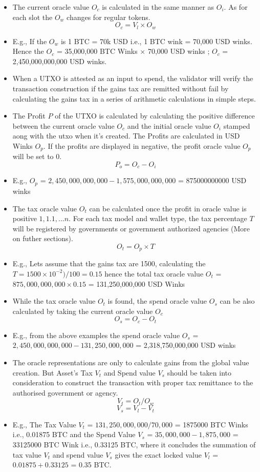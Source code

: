 \documentclass[letterpaper,11pt]{article}
\begin{document}
\begin{itemize}[wide, labelwidth=!, labelindent=0pt]
\item The current oracle value $O_c$ is calculated in the same manner as $O_i$. As for each slot the $O_w$ changes for regular tokens.
\[O_c = V_l \times O_w\]
\item E.g., If the $O_w$ is 1 BTC = 70k USD i.e., 1 BTC wink = 70,000 USD winks. Hence the $O_c$ = 35,000,000 BTC Winks $\times$ 70,000 USD winks ; $O_c$ = 2,450,000,000,000 USD winks.
\item When a UTXO is attested as an input to spend, the validator will verify the transaction construction if the gains tax are remitted without fail by calculating the gains tax in a series of arithmetic calculations in simple steps.
\item The Profit $P$ of the UTXO is calculated by calculating the positive difference between the current oracle value $O_c$ and the initial oracle value $O_i$ stamped aong with the utxo when it's created. The Profits are calculated in USD Winks $O_p$. If the profits are displayed in negative, the profit oracle value $O_p$ will be set to $0$.
\[P_o = O_c - O_i\]
\item E.g., $O_p$ = $2,450,000,000,000 - 1,575,000,000,000$ = 875000000000 USD winks
\item The tax oracle value $O_t$ can be calculated once the profit in oracle value is positive $1,1.1,...n$. For each tax model and wallet type, the tax percentage $T$ will be registered by governments or government authorized agencies (More on futher sections).
\[O_t = O_p \times T\]
\item E.g., Lets assume that the gains tax are 1500, calculating the $T = 1500 \times 10^{-2}) / 100 = 0.15 $ hence the total tax oracle value $O_t$ = $875,000,000,000 \times 0.15 $ = 131,250,000,000 USD Winks
\item While the tax oracle value $O_t$ is found, the spend oracle value $O_s$ can be also calculated by taking the current oracle value $O_c$
\[O_s = O_c - O_t\]
\item E.g., from the above examples the spend oracle value $O_s$ = $2,450,000,000,000 - 131,250,000,000$ = 2,318,750,000,000 USD winks
\item The oracle representations are only to calculate gains from the global value creation. But Asset's Tax $V_t$ and Spend value $V_s$ should be taken into consideration to construct the transaction with proper tax remittance to the authorised government or agency.
\[V_t = O_t / O_w\]
\[V_s = V_l - V_t\]
\item E.g., The Tax Value $V_t$ = $131,250,000,000 / 70,000$ = 1875000 BTC Winks i.e., 0.01875 BTC and the Spend Value $V_s$ = $35,000,000 - 1,875,000$ = 33125000 BTC Wink i.e., 0.33125 BTC, where it concludes the summation of tax value $V_t$ and spend value $V_s$ gives the exact locked value $V_l$ = $0.01875 + 0.33125$ = 0.35 BTC.
\end{itemize}
\end{document}
